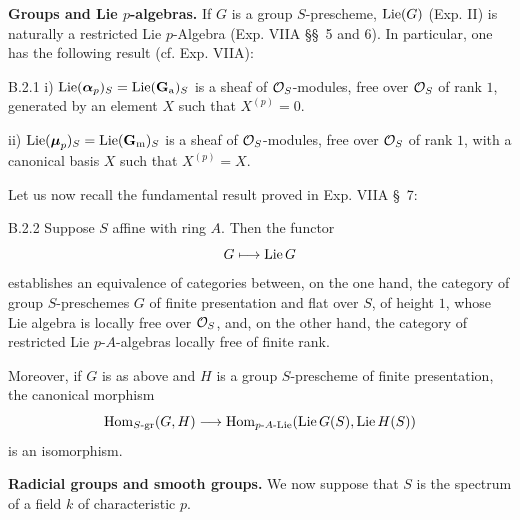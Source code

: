 \label{XVII.B.2}\textbf{Groups and Lie $p$-algebras.}
If $G$ is a group $S$-prescheme, $\operatorname{Lie}(G)$ (Exp. II) is naturally a restricted Lie $p$-Algebra (Exp. VIIA \S\S\ 5 and 6). In particular, one has the following result (cf. Exp. VIIA):
\setcounter{footnote}{10}
\begin{proposition}{B.2.1}\label{XVII.B.2.1}
\noindent i) $\operatorname{Lie}(\boldsymbol{\alpha}_p)_S=\operatorname{Lie}(\mathbf{G}_{\mathrm{a}})_S$ is a sheaf of $\mathcal{O}_S$-modules, free over $\mathcal{O}_S$ of rank $1$, generated by an element $X$ such that $X^{(p)}=0$.

\noindent ii) $\operatorname{Lie}(\boldsymbol{\mu}_p)_S=\operatorname{Lie}(\mathbf{G}_{\mathrm{m}})_S$ is a sheaf of $\mathcal{O}_S$-modules, free over $\mathcal{O}_S$ of rank $1$, with a canonical basis $X$ such that $X^{(p)}=X$.
\end{proposition}
Let us now recall the fundamental result proved in Exp. VIIA \S\ 7:
\begin{theorem}{B.2.2}\label{XVII.B.2.2}
Suppose $S$ affine with ring $A$. Then the functor
\[
G\longmapsto\operatorname{Lie} G
\]
establishes an equivalence of categories between, on the one hand, the category of group $S$-preschemes $G$ of finite presentation and flat over $S$, of height $1$, whose Lie algebra is locally free over $\mathcal{O}_S$, and, on the other hand, the category of restricted Lie $p$-$A$-algebras locally free of finite rank.

Moreover, if $G$ is as above and $H$ is a group $S$-prescheme of finite presentation, the canonical morphism
\[
\operatorname{Hom}_{S\text{-gr}}(G,H)\longrightarrow\operatorname{Hom}_{p\text{-}A\text{-Lie}}(\operatorname{Lie} G(S),\operatorname{Lie} H(S))
\]
is an isomorphism.
\end{theorem}
\label{XVII.B.3}\textbf{Radicial groups and smooth groups.}
We now suppose that $S$ is the spectrum of a field $k$ of characteristic $p$.

